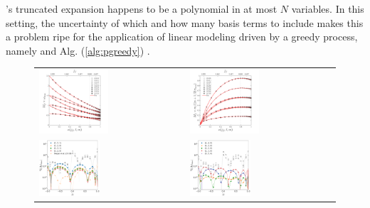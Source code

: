 \documentclass[twocolumn,aps,prd,floatfix,preprintnumbers,a4paper,nofootinbib,
superscriptaddress,10pt]{revtex4-1}
\begin{document}
%
%
\par {}'s truncated expansion happens to be a polynomial in at most $N$ variables.
%
In this setting, the uncertainty of which and how many basis terms to include makes this a problem ripe for the application of linear modeling driven by a greedy process, namely  and Alg. (\ref{alg:pgreedy}) .
%
%
\begin{figure}[htb]
  \begin{tabular}{ll}
    {\includegraphics[width=0.49\textwidth]{fits_w.pdf}} & {\includegraphics[width=0.49\textwidth]{fits_tau.pdf}}
    \\
    \hspace{0.35cm}\includegraphics[width=0.43\textwidth]{res_cw_0.pdf} & \hspace{0.3cm}\includegraphics[width=0.43\textwidth]{res_cw_1.pdf}

\end{tabular}
\end{figure}
\end{document}

